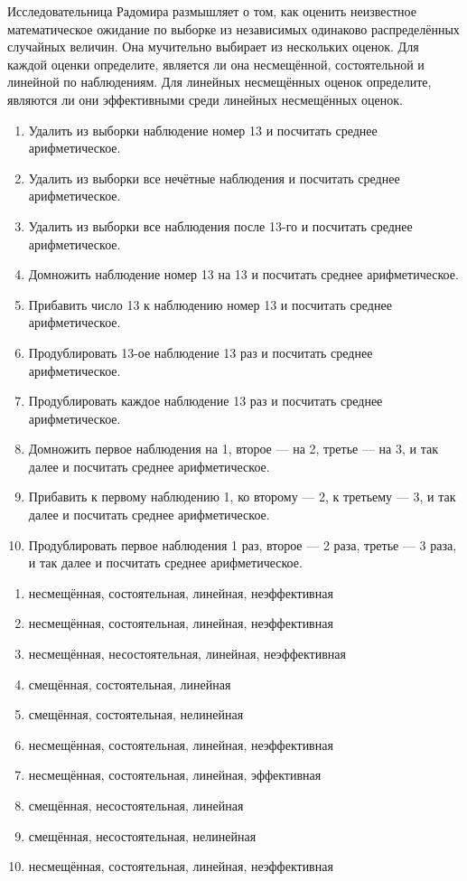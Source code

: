 \documentclass[12pt, a4paper]{article}
\newcounter{problem}[section]
\newenvironment{problem}%
{%
\refstepcounter{problem}%
     \hypertarget{problem:{\thesection.\theproblem}}{} %
     \Writetofile{solution_file}{\protect\hypertarget{soln:\thesection.\theproblem}{}}
     \begin{myenum}[label=\bfseries\protect\hyperlink{soln:\thesection.\theproblem}{\thesection.\theproblem},ref=\thesection.\theproblem]
     \item%
    }%
    {%
    \end{myenum}}
\begin{document}
\begin{problem}
Исследовательница Радомира размышляет о том, как оценить неизвестное математическое ожидание по выборке из независимых одинаково распределённых случайных величин. Она мучительно выбирает из нескольких оценок. Для каждой оценки определите, является ли она несмещённой, состоятельной и линейной по наблюдениям. Для линейных несмещённых оценок определите, являются ли они эффективными среди линейных несмещённых оценок.
\begin{enumerate}
\item Удалить из выборки наблюдение номер 13 и посчитать среднее арифметическое.
\item Удалить из выборки все нечётные наблюдения и посчитать среднее арифметическое.
\item Удалить из выборки все наблюдения после 13-го и посчитать среднее арифметическое.
\item Домножить наблюдение номер 13 на 13 и посчитать среднее арифметическое.
\item Прибавить число 13 к наблюдению номер 13 и посчитать среднее арифметическое.
\item Продублировать 13-ое наблюдение 13 раз и посчитать среднее арифметическое.
\item Продублировать каждое наблюдение 13 раз и посчитать среднее арифметическое.
\item Домножить первое наблюдения на 1, второе — на 2, третье — на 3, и так далее и посчитать среднее арифметическое.
\item Прибавить к первому наблюдению 1, ко второму — 2, к третьему — 3, и так далее и посчитать среднее арифметическое.
\item Продублировать первое наблюдения 1 раз, второе — 2 раза, третье — 3 раза, и так далее и посчитать среднее арифметическое.
\end{enumerate}
  \begin{sol}
    \begin{enumerate}
    \item несмещённая, состоятельная, линейная, неэффективная
    \item несмещённая, состоятельная, линейная, неэффективная
    \item несмещённая, несостоятельная, линейная, неэффективная
    \item смещённая, состоятельная, линейная
    \item смещённая, состоятельная, нелинейная
    \item несмещённая, состоятельная, линейная, неэффективная
    \item несмещённая, состоятельная, линейная, эффективная
    \item смещённая, несостоятельная, линейная
    \item смещённая, несостоятельная, нелинейная
    \item несмещённая, состоятельная, линейная, неэффективная
    \end{enumerate}
  \end{sol}
\end{problem}
\end{document}
